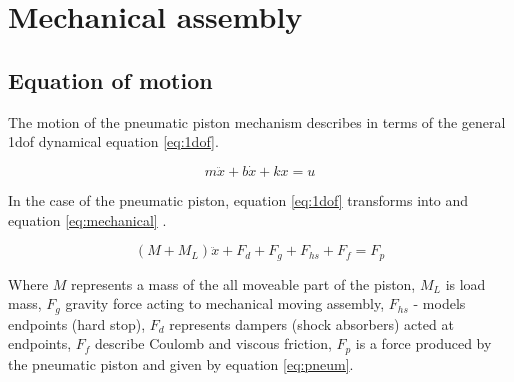 

\section{Mechanical assembly}
\subsection{Equation of motion}

The motion of the pneumatic piston mechanism describes in terms of the
general 1dof dynamical equation \ref{eq:1dof}. 

\begin{equation}
    m\ddot{x} + b\dot{x} + kx = u
    \label{eq:1dof}
\end{equation}

In the case of the pneumatic piston, equation \ref{eq:1dof}
transforms into and equation \ref{eq:mechanical} \cite{isermann_mech}.

\begin{equation}
    (M + M_L) \ddot{x} + F_{d} + F_g + F_{hs} + F_f  = F_p
    \label{eq:mechanical}
\end{equation}

Where $M$ represents a mass of the all moveable part of the piston,
$M_L$ is load mass, $F_g$ gravity force acting to mechanical moving assembly,
$F_{hs}$ - models endpoints (hard stop),
$F_{d}$ represents dampers (shock absorbers) acted at endpoints,
$F_f$ describe Coulomb and viscous friction,
$F_{p}$ is a force produced by the pneumatic piston and given by equation \ref{eq:pneum}.

